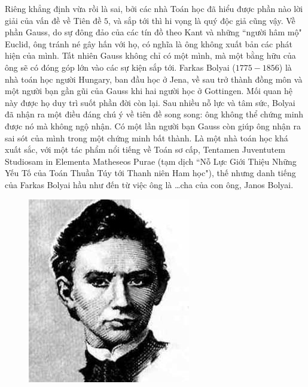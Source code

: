 \begin{multicols}{2}
	\vskip 0.1cm
	Riêng khẳng định vừa rồi là sai, bởi các nhà Toán học đã hiểu được phần nào lời giải của vấn đề về Tiên đề $5$, và sắp tới thì hi vọng là quý độc giả cũng vậy. Về phần Gauss, do sự đông đảo của các tín đồ theo Kant và những ``người hâm mộ" Euclid, ông tránh né gây hấn với họ, có nghĩa là ông không xuất bản các phát hiện của mình. Tất nhiên Gauss không chỉ có một mình, mà một bằng hữu của ông sẽ có đóng góp lớn vào các sự kiện sắp tới.
	\vskip 0.1cm
	Farkas Bolyai ($1775-1856$) là nhà toán học người Hungary, ban đầu học ở Jena, về sau trở thành đồng môn và một người bạn gần gũi của Gauss khi hai người học ở Gottingen. Mối quan hệ này được họ duy trì suốt phần đời còn lại. 
	\vskip 0.1cm
	Sau nhiều nỗ lực và tâm sức, Bolyai đã nhận ra một điều đáng chú ý về tiên đề song song: ông không thể chứng minh được nó mà không ngộ nhận. Có một lần người bạn Gauss còn giúp ông nhận ra sai sót của mình trong một chứng minh bất thành. Là một nhà toán học khá xuất sắc, với một tác phẩm nổi tiếng về Toán sơ cấp, Tentamen Juventutem Studiosam in Elementa Matheseos Purae (tạm dịch ``Nỗ Lực Giới Thiệu Những Yếu Tố của Toán Thuần Túy tới Thanh niên Ham học"), thế nhưng danh tiếng của Farkas Bolyai hầu như đến từ việc ông là \ldots cha của con ông, Janos Bolyai. 
	\begin{figure}[H]
		\vspace*{5pt}
		\centering
		\captionsetup{labelformat= empty, justification=centering}
		\includegraphics[width= 1\linewidth]{JanosBolyai}

\end{figure}
\end{multicols}
